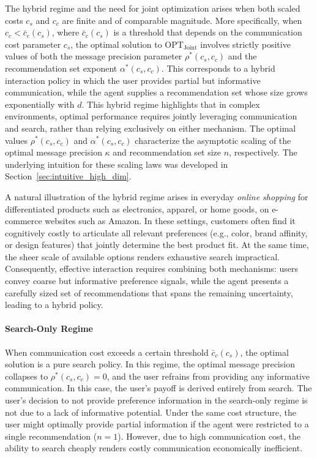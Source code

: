 \documentclass[12pt]{article}
\theoremstyle{definition}
\theoremstyle{remark}
\begin{document}
The hybrid regime and the need for joint optimization arises when both scaled costs $c_s$ and $c_c$ are finite and of comparable magnitude. More specifically, when $c_c < \bar c_c(c_s)$, where $\bar c_c(c_s)$ is a threshold that depends on the communication cost parameter $c_s$, the optimal solution to OPT$_{\text{Joint}}$ involves strictly positive values of both the message precision parameter $\rho^*(c_s,c_c)$ and the recommendation set exponent $\alpha^*(c_s,c_c)$. This corresponds to a hybrid interaction policy in which the user provides partial but informative communication, while the agent supplies a recommendation set whose size grows exponentially with $d$. This hybrid regime highlights that in complex environments, optimal performance requires jointly leveraging communication and search, rather than relying exclusively on either mechanism. The optimal values $\rho^*(c_s,c_c)$ and $\alpha^*(c_s,c_c)$ characterize the asymptotic scaling of the optimal message precision $\kappa$ and recommendation set size $n$, respectively. The underlying intuition for these scaling laws was developed in Section~\ref{sec:intuitive_high_dim}.

A natural illustration of the hybrid regime arises in everyday \textit{online shopping} for differentiated products such as electronics, apparel, or home goods, on e-commerce websites such as Amazon. In these settings, customers often find it cognitively costly to articulate all relevant preferences (e.g., color, brand affinity, or design features) that jointly determine the best product fit. At the same time, the sheer scale of available options renders exhaustive search impractical. Consequently, effective interaction requires combining both mechanisms: users convey coarse but informative preference signals, while the agent presents a carefully sized set of recommendations that spans the remaining uncertainty, leading to a hybrid policy.

\paragraph{Search-Only Regime
} When communication cost exceeds a certain threshold $\bar c_c(c_s)$, the optimal solution is a pure search policy. In this regime, the optimal message precision collapses to $\rho^*(c_s,c_c)=0$, and the user refrains from providing any informative communication. In this case, the user’s payoff is derived entirely from search. The user's decision to not provide preference information in the search-only regime is not due to a lack of informative potential. Under the same cost structure, the user might optimally provide partial information if the agent were restricted to a single recommendation ($n=1$). However, due to high communication cost, the ability to search cheaply renders costly communication economically inefficient.
\end{document}
